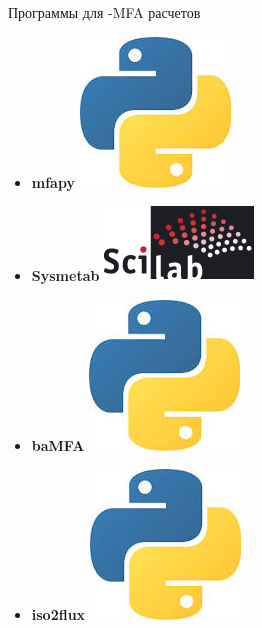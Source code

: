 \documentclass[aspectratio=169]{beamer}
\begin{document}
\begin{frame}{Программы для -MFA расчетов}
\begin{itemize}
		\item \textbf{mfapy} \includegraphics[height=\fontcharht\font`\B]{python.jpeg}
		
		\item \textbf{Sysmetab} \includegraphics[height=\fontcharht\font`\B]{Scilab_logo.png}
		
		\item \textbf{baMFA} \includegraphics[height=\fontcharht\font`\B]{python.jpeg}
		\item \textbf{iso2flux} \includegraphics[height=\fontcharht\font`\B]{python.jpeg}
		

\end{itemize}
\end{frame}
\end{document}

